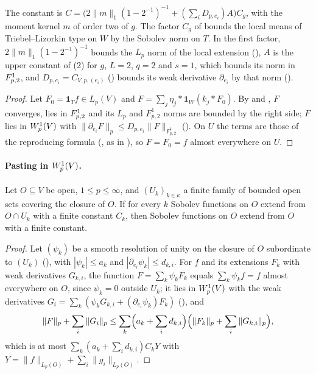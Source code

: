 The constant is $C = \bigl(2 \|m\|_1 (1 - 2^{-1})^{-1} + (\sum_i D_{p, e_i}) A\bigr) C_g$, with
the moment kernel $m$ of order two of $g$. The factor $C_g$ of
 bounds the local means of Triebel--Lizorkin type on $W$ by the
Sobolev norm on $T$. In the first factor, $2 \|m\|_1 (1 - 2^{-1})^{-1}$ bounds the $L_p$ norm of
the local extension (), $A$ is the upper constant of
 (2) for $g$, $L = 2$, $q = 2$ and $s = 1$, which bounds its norm in
$F^{1}_{p,2}$, and $D_{p,e_i} = C_{V,p,(e_i)}$ () bounds its weak
derivative $\partial_{e_i}$ by that norm ().

\begin{proof}
\leanok
Let $F_0 = \mathbf 1_T f \in L_p(V)$ and $F = \sum_j \eta_j * \mathbf 1_W (k_j * F_0)$. By
 and , $F$ converges, lies in
$F^{1}_{p,2}$ and its $L_p$ and $F^1_{p,2}$ norms are bounded by the right side; $F$ lies in
$W^{1}_{p}(V)$ with $\|\partial_{e_i} F\|_p \leq D_{p,e_i} \|F\|_{F^1_{p,2}}$
(). On $U$ the terms are those of the reproducing formula
(, as in ), so $F = F_0 = f$ almost
everywhere on $U$.
\end{proof}

\paragraph{Pasting in $W^{1}_{p}(V)$.}

\begin{theorem}
\label{thm:pasting-sobolev}
\leanok
{}
Let $O \subseteq V$ be open, $1 \leq p \leq \infty$, and $(U_k)_{k \in \kappa}$ a finite family of
bounded open sets covering the closure of $O$. If for every $k$ Sobolev functions on $O$ extend
from $O \cap U_k$ with a finite constant $C_k$, then Sobolev functions on $O$ extend from $O$
with a finite constant.
\end{theorem}

\begin{proof}
\leanok
Let $(\psi_k)$ be a smooth resolution of unity on the closure of $O$ subordinate to $(U_k)$
(), with $|\psi_k| \leq a_k$ and $|\partial_{e_i} \psi_k| \leq
d_{k,i}$. For $f$ and its extensions $F_k$ with weak derivatives $G_{k,i}$, the function
$F = \sum_k \psi_k F_k$ equals $\sum_k \psi_k f = f$ almost everywhere on $O$, since
$\psi_k = 0$ outside $U_k$; it lies in $W^{1}_{p}(V)$ with the weak derivatives
$G_i = \sum_k (\psi_k G_{k,i} + (\partial_{e_i} \psi_k) F_k)$ (), and
\[
  \|F\|_p + \sum_i \|G_i\|_p \leq \sum_k \Bigl(a_k + \sum_i d_{k,i}\Bigr)
  \Bigl(\|F_k\|_p + \sum_i \|G_{k,i}\|_p\Bigr) ,
\]
which is at most $\sum_k (a_k + \sum_i d_{k,i}) C_k Y$ with
$Y = \|f\|_{L_p(O)} + \sum_i \|g_i\|_{L_p(O)}$.
\end{proof}

